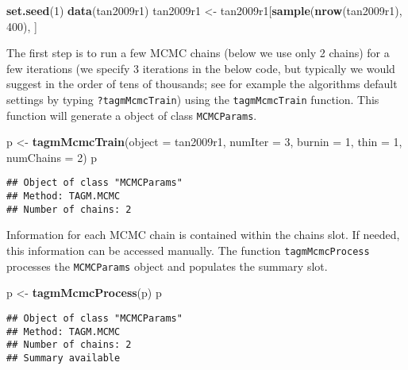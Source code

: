 \documentclass[9pt,a4paper,]{extarticle}
\newenvironment{Shaded}{\begin{snugshade}}{\end{snugshade}}
\newcommand{\DataTypeTok}[1]{\textcolor[rgb]{0.13,0.29,0.53}{#1}}
\newcommand{\DecValTok}[1]{\textcolor[rgb]{0.00,0.00,0.81}{#1}}
\newcommand{\KeywordTok}[1]{\textcolor[rgb]{0.13,0.29,0.53}{\textbf{#1}}}
\newcommand{\NormalTok}[1]{#1}
\newcommand{\StringTok}[1]{\textcolor[rgb]{0.31,0.60,0.02}{#1}}
\begin{document}
\begin{Shaded}
\begin{Highlighting}[]
\KeywordTok{set.seed}\NormalTok{(}\DecValTok{1}\NormalTok{)}
\KeywordTok{data}\NormalTok{(tan2009r1)}
\NormalTok{tan2009r1 <-}\StringTok{ }\NormalTok{tan2009r1[}\KeywordTok{sample}\NormalTok{(}\KeywordTok{nrow}\NormalTok{(tan2009r1), }\DecValTok{400}\NormalTok{), ]}
\end{Highlighting}
\end{Shaded}

The first step is to run a few MCMC chains (below we use only 2 chains)
for a few iterations (we specify 3 iterations in the below code, but
typically we would suggest in the order of tens of thousands; see for
example the algorithms default settings by typing \texttt{?tagmMcmcTrain})
using the \texttt{tagmMcmcTrain} function. This function will generate a
object of class \texttt{MCMCParams}.

\begin{Shaded}
\begin{Highlighting}[]
\NormalTok{p <-}\StringTok{ }\KeywordTok{tagmMcmcTrain}\NormalTok{(}\DataTypeTok{object =}\NormalTok{ tan2009r1, }\DataTypeTok{numIter =} \DecValTok{3}\NormalTok{,}
                   \DataTypeTok{burnin =} \DecValTok{1}\NormalTok{, }\DataTypeTok{thin =} \DecValTok{1}\NormalTok{, }\DataTypeTok{numChains =} \DecValTok{2}\NormalTok{)}
\NormalTok{p}
\end{Highlighting}
\end{Shaded}

\begin{verbatim}
## Object of class "MCMCParams"
## Method: TAGM.MCMC 
## Number of chains: 2
\end{verbatim}

Information for each MCMC chain is contained within the chains
slot. If needed, this information can be accessed manually. The
function \texttt{tagmMcmcProcess} processes the \texttt{MCMCParams} object and populates
the summary slot.

\begin{Shaded}
\begin{Highlighting}[]
\NormalTok{p <-}\StringTok{ }\KeywordTok{tagmMcmcProcess}\NormalTok{(p)}
\NormalTok{p}
\end{Highlighting}
\end{Shaded}

\begin{verbatim}
## Object of class "MCMCParams"
## Method: TAGM.MCMC 
## Number of chains: 2 
## Summary available
\end{verbatim}
\end{document}

